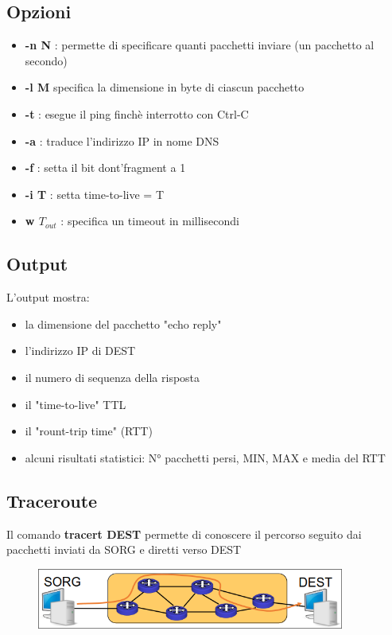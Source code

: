 \documentclass{report}
\begin{document}
            \subsection{Opzioni}
                \begin{itemize}
                    \item \textbf{-n N} : permette di specificare quanti pacchetti inviare (un pacchetto al secondo)
                    \item \textbf{-l M} specifica la dimensione in byte di ciascun pacchetto
                    \item \textbf{-t} : esegue il ping finchè interrotto con Ctrl-C
                    \item \textbf{-a} : traduce l'indirizzo IP in nome DNS
                    \item \textbf{-f} : setta il bit dont'fragment a 1
                    \item \textbf{-i T} : setta time-to-live = T
                    \item \textbf{w $T_{out}$} : specifica un timeout in millisecondi
                \end{itemize}
            \subsection{Output}
                L'output mostra: 
                \begin{itemize}
                    \item la dimensione del pacchetto "echo reply"
                    \item l'indirizzo IP di DEST
                    \item il numero di sequenza della risposta
                    \item il "time-to-live" TTL
                    \item il "rount-trip time" (RTT)
                    \item alcuni risultati statistici: N° pacchetti persi, MIN, MAX e media del RTT
                \end{itemize}
            \subsection{Traceroute}
                Il comando \textbf{tracert DEST} permette di conoscere il percorso seguito dai pacchetti inviati da SORG e diretti verso DEST
                \begin{figure}[H]
                    \includegraphics[width=0.9\textwidth]{2/trace.png}
                \end{figure}                
\end{document}
